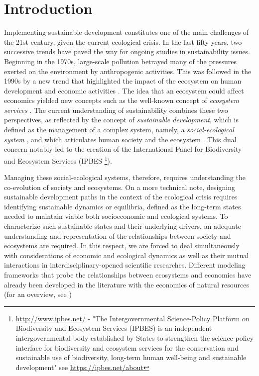 \section{Introduction}
\onehalfspacing

Implementing sustainable development constitutes one of the main challenges of the 21st century, given the current ecological crisis.  In the last fifty years, two successive trends have paved the way for ongoing studies in sustainability issues. Beginning in the 1970s, large-scale pollution betrayed many of the pressures exerted on the environment by anthropogenic activities. This was followed in the 1990s by a new trend that highlighted the impact of the ecosystem on human development and economic activities \citep{Costanza1997}. The idea that an ecosystem could affect economics yielded new concepts such as the well-known concept of \textit{ecosystem services} \citep{Daily97b,MEA2005,Bateman2013}. The current understanding of sustainability combines these two perspectives, as reflected by the concept of \textit{sustainable development}, which is defined as the management of a complex system, namely, a \textit{social-ecological system} \citep{Ostrom2009}, and which articulates human society and the ecosystem \citep{Dasgupta2007}. This dual concern notably led to the creation of the International Panel for Biodiversity and Ecosystem Services (IPBES \footnote{\url{http://www.ipbes.net/} - "The Intergovernmental Science-Policy Platform on Biodiversity and Ecosystem Services (IPBES) is an independent intergovernmental body established by States to strengthen the science-policy interface for biodiversity and ecosystem services for the conservation and sustainable use of biodiversity, long-term human well-being and sustainable development" see \url{https://ipbes.net/about}}).
 
Managing these social-ecological systems, therefore, requires understanding the co-evolution of society and ecosystems. On a more technical note, designing sustainable development paths in the context of the ecological crisis requires identifying sustainable dynamics or equilibria, defined as the long-term states needed to maintain viable both socioeconomic and ecological systems. 
To characterize such sustainable states and their underlying drivers, an adequate understanding and representation of the relationships between society and ecosystems are required. In this respect, we are forced to deal simultaneously with considerations of economic and ecological dynamics as well as their mutual interactions in interdisciplinary-opened scientific researches. Different modeling frameworks that probe the relationships between ecosystems and economics have already been developed in the literature with the economics of natural resources (for an overview, see \cite{Halvorsen2015}) 

